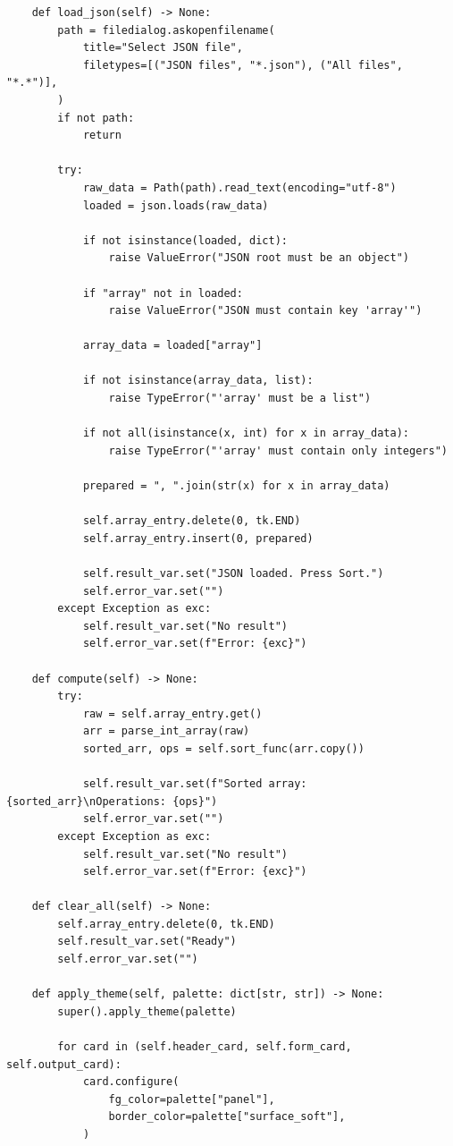 \documentclass[12pt,a4paper]{article}
\begin{document}
\begin{verbatim}
    def load_json(self) -> None:
        path = filedialog.askopenfilename(
            title="Select JSON file",
            filetypes=[("JSON files", "*.json"), ("All files", "*.*")],
        )
        if not path:
            return

        try:
            raw_data = Path(path).read_text(encoding="utf-8")
            loaded = json.loads(raw_data)

            if not isinstance(loaded, dict):
                raise ValueError("JSON root must be an object")

            if "array" not in loaded:
                raise ValueError("JSON must contain key 'array'")

            array_data = loaded["array"]

            if not isinstance(array_data, list):
                raise TypeError("'array' must be a list")

            if not all(isinstance(x, int) for x in array_data):
                raise TypeError("'array' must contain only integers")

            prepared = ", ".join(str(x) for x in array_data)

            self.array_entry.delete(0, tk.END)
            self.array_entry.insert(0, prepared)

            self.result_var.set("JSON loaded. Press Sort.")
            self.error_var.set("")
        except Exception as exc:
            self.result_var.set("No result")
            self.error_var.set(f"Error: {exc}")

    def compute(self) -> None:
        try:
            raw = self.array_entry.get()
            arr = parse_int_array(raw)
            sorted_arr, ops = self.sort_func(arr.copy())

            self.result_var.set(f"Sorted array: {sorted_arr}\nOperations: {ops}")
            self.error_var.set("")
        except Exception as exc:
            self.result_var.set("No result")
            self.error_var.set(f"Error: {exc}")

    def clear_all(self) -> None:
        self.array_entry.delete(0, tk.END)
        self.result_var.set("Ready")
        self.error_var.set("")

    def apply_theme(self, palette: dict[str, str]) -> None:
        super().apply_theme(palette)

        for card in (self.header_card, self.form_card, self.output_card):
            card.configure(
                fg_color=palette["panel"],
                border_color=palette["surface_soft"],
            )


\end{verbatim}
\end{document}
